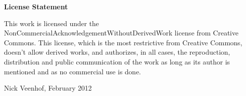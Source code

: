 
\newpage
\noindent \textbf{\huge License Statement}

\vspace{1.5cm}

\noindent
This work is licensed under the NonCommercialAcknowledgementWithoutDerivedWork license from Creative Commons. 
This license, which is the most restrictive from Creative Commons, doesn't allow derived works, and authorizes, in all cases, the reproduction, distribution and public communication of the work as long as its author is mentioned and as no commercial use is done.

\addvspace{4cm}

\noindent Nick Veenhof, February 2012
